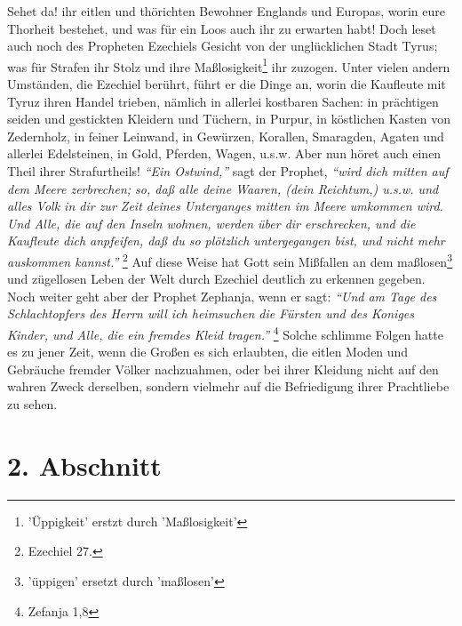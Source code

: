 Sehet da! ihr eitlen und thörichten Bewohner Englands und Europas, worin eure
Thorheit bestehet, und was für ein Loos auch ihr zu erwarten habt! Doch leset
auch noch des Propheten Ezechiels Gesicht von der unglücklichen Stadt Tyrus; was
für Strafen ihr Stolz und ihre Maßlosigkeit\footnote{'Üppigkeit' erstzt durch 'Maßlosigkeit'} ihr zuzogen. Unter vielen andern
Umständen, die Ezechiel berührt, führt er die Dinge an, worin die Kaufleute mit
Tyruz ihren Handel trieben, nämlich in allerlei kostbaren Sachen: in prächtigen
seiden und gestickten Kleidern und Tüchern, in Purpur, in köstlichen Kasten von
Zedernholz, in feiner Leinwand, in Gewürzen, Korallen, Smaragden, Agaten und
allerlei Edelsteinen, in Gold, Pferden, Wagen, u.s.w. Aber nun höret auch einen
Theil ihrer Strafurtheils! \textit{"`Ein Ostwind,"'} sagt der Prophet,
\textit{"`wird dich mitten
auf dem Meere zerbrechen; so, daß alle deine Waaren, (dein Reichtum,) u.s.w.
und alles Volk in dir zur Zeit deines Unterganges mitten im Meere umkommen wird.
Und Alle, die auf den Inseln wohnen, werden über dir erschrecken, und die
Kaufleute dich anpfeifen, daß du so plötzlich untergegangen bist, und nicht mehr
auskommen kannst."'}
\footnote{Ezechiel 27.}
Auf diese Weise hat Gott sein Mißfallen
an dem maßlosen\footnote{'üppigen' ersetzt durch 'maßlosen'} und zügellosen Leben der Welt durch Ezechiel deutlich zu erkennen
gegeben. Noch weiter geht aber der Prophet Zephanja, wenn er sagt:
\textit{"`Und am Tage
des Schlachtopfers des Herrn will ich heimsuchen die Fürsten und des Koniges
Kinder, und Alle, die ein fremdes Kleid tragen."'}
\footnote{Zefanja 1,8}
Solche
schlimme Folgen hatte es zu jener Zeit, wenn die Großen es sich erlaubten, die
eitlen Moden und Gebräuche fremder Völker nachzuahmen, oder bei ihrer Kleidung
nicht auf den wahren Zweck derselben, sondern vielmehr auf die Befriedigung
ihrer Prachtliebe zu sehen.

\section{2. Abschnitt} \label{kap15_ab2}

